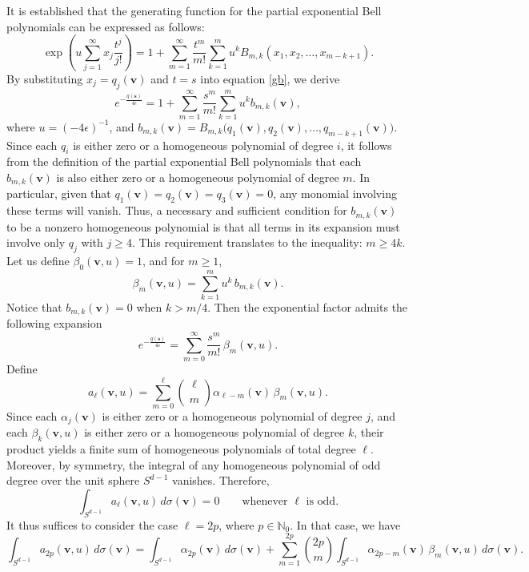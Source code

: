 \documentclass{amsart}
\theoremstyle{Theorem}
\theoremstyle{remark}
\numberwithin{equation}{section} \numberwithin{figure}{section}
\newcommand{\mf}[1]{\mathbf{#1}}
\begin{document}
It is established that the generating function for the partial exponential Bell polynomials can be expressed as follows:
\begin{equation}\label{gb}
\exp\left(u \sum_{j=1}^\infty x_j \frac{t^j}{j!} \right)
= 1 + \sum_{m=1}^\infty \frac{t^m}{m!} \sum_{k=1}^m u^k B_{m,k}(x_1, x_2, \dots, x_{m-k+1}).
\end{equation}
By substituting \( x_j = q_j(\mathbf{v}) \) and \( t = s \) into equation \eqref{gb}, we derive
\[
e^{-\frac{q(\mathbf{s})}{4\epsilon}} = 1 + \sum_{m=1}^\infty \frac{s^m}{m!} \sum_{k=1}^m u^k b_{m,k}(\mathbf{v}),
\]
where \( u = (-4\epsilon)^{-1} \), and
\(
b_{m,k}(\mathbf{v}) = B_{m,k}\big(q_1(\mathbf{v}), q_2(\mathbf{v}), \dots, q_{m-k+1}(\mathbf{v})\big).
\)
Since each \( q_i \) is either zero or a homogeneous polynomial of degree \( i \), it follows from the definition of the partial exponential Bell polynomials that each \( b_{m,k}(\mathbf{v}) \) is also either zero or a homogeneous polynomial of degree \( m \).
In particular, given that \( q_1(\mathbf{v}) = q_2(\mathbf{v}) = q_3(\mathbf{v}) = 0 \), any monomial involving these terms will vanish. Thus, a necessary and sufficient condition for \( b_{m,k}(\mathbf{v}) \) to be a nonzero homogeneous polynomial is that all terms in its expansion must involve only \( q_j \) with \( j \geq 4 \). This requirement translates to the inequality:
\(
m \geq 4k.
\)
Let us define \( \beta_0(\mathbf{v}, u) = 1 \), and for \( m \geq 1 \),
\[
\beta_m(\mathbf{v}, u) = \sum_{k=1}^{m} u^k \, b_{m,k}(\mathbf{v}).
\]
Notice that $b_{m,k}(\mf v)=0$ when $k>m/4.$ Then the exponential factor admits the following expansion
\[
e^{-\frac{q(\mathbf{s})}{4\varepsilon}} = \sum_{m=0}^\infty \frac{s^m}{m!} \, \beta_m(\mathbf{v}, u).
\]
Define
\[
a_\ell(\mathbf{v}, u) = \sum_{m=0}^\ell \binom{\ell}{m} \alpha_{\ell - m}(\mathbf{v}) \, \beta_m(\mathbf{v}, u).
\]
Since each \( \alpha_j(\mathbf{v}) \) is either zero or a homogeneous polynomial of degree \( j \), and each \( \beta_k(\mathbf{v}, u) \) is either zero or a homogeneous polynomial of degree \( k \), their product yields a finite sum of homogeneous polynomials of total degree \( \ell \).  
Moreover, by symmetry, the integral of any homogeneous polynomial of odd degree over the unit sphere \( S^{d-1} \) vanishes. Therefore,
\[
\int_{S^{d-1}} a_\ell(\mathbf{v}, u) \, d\sigma(\mathbf{v}) = 0 \qquad \text{whenever } \ell \text{ is odd}.
\]
It thus suffices to consider the case \( \ell = 2p \), where \( p \in \mathbb{N}_0 \). In that case, we have
\[
\int_{S^{d-1}} a_{2p}(\mathbf{v}, u) \, d\sigma(\mathbf{v}) = 
\int_{S^{d-1}} \alpha_{2p}(\mathbf{v}) \, d\sigma(\mathbf{v}) 
+ \sum_{m=1}^{2p} \binom{2p}{m} \int_{S^{d-1}} \alpha_{2p - m}(\mathbf{v}) \, \beta_m(\mathbf{v}, u) \, d\sigma(\mathbf{v}).
\]
\end{document}
